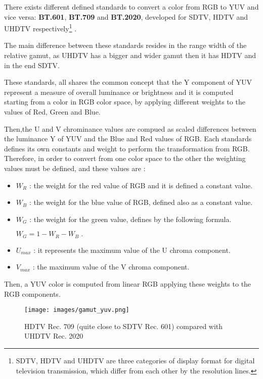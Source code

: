 \documentclass[12pt,a4paper]{extarticle}
\begin{document}
There exists different defined standards to convert a color from RGB to YUV and vice versa: \textbf{BT.601}, \textbf{BT.709} and \textbf{BT.2020}, developed for SDTV, HDTV and  UHDTV respectively\footnote{SDTV, HDTV and UHDTV are three categories of display format for digital television transmission, which differ from each other by the resolution lines.} \cite{wiki_yuv}.

The main difference between these standards resides in the range width of the relative gamut, as UHDTV has a bigger and wider gamut then it has HDTV and in the end SDTV.

These standards, all shares the common concept that the Y component of YUV represent a measure of overall luminance or brightness and it is computed starting from a color in RGB color space, by applying different weights to the values of Red, Green and Blue.

Then,the U and V chrominance values are compued as scaled differences between the luminance Y of YUV and the Blue and Red values of RGB.
Each standards defines its own constants and weight to perform the transformation from RGB.
Therefore, in order to convert from one color space to the other the weighting values must be defined, and these values are :
\begin{itemize}
\item $W_{R}$ : the weight for the red value of RGB and it is defined a constant value.
\item $W_{B}$ : the weight for the blue value of RGB, defined also as a constant value.
\item $W_{G}$ : the weight for the green value, defines by the following formula.
\begin{center}
$W_{G}=1-W_{R}-W_{B} \;.$ 
\end{center}
\item $U_{max}$ : it represents the maximum value of the U chroma component.
\item $V_{max}$ : the maximum value of the V chroma component.
\end{itemize}
Then, a YUV color is computed from linear RGB %
applying these weights to the RGB components.

\begin{figure}[hbtp]
\centering
\texttt{[image: images/gamut\_yuv.png]}
\caption{HDTV Rec. 709 (quite close to SDTV Rec. 601) compared with UHDTV Rec. 2020} 
\end{figure}
\end{document}
